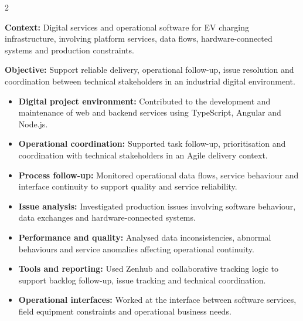 \documentclass[8pt,a4paper,ragged2e,withhyper]{altacv}
\begin{document}



\makecvheader
\vspace{-0.3cm}


\begin{paracol}{2}



\textbf{Context:} Digital services and operational software for EV charging infrastructure, involving platform services, data flows, hardware-connected systems and production constraints.

\textbf{Objective:} Support reliable delivery, operational follow-up, issue resolution and coordination between technical stakeholders in an industrial digital environment.

\begin{itemize}
  \item \textbf{Digital project environment:} Contributed to the development and maintenance of web and backend services using TypeScript, Angular and Node.js.
  \item \textbf{Operational coordination:} Supported task follow-up, prioritisation and coordination with technical stakeholders in an Agile delivery context.
  \item \textbf{Process follow-up:} Monitored operational data flows, service behaviour and interface continuity to support quality and service reliability.
  \item \textbf{Issue analysis:} Investigated production issues involving software behaviour, data exchanges and hardware-connected systems.
  \item \textbf{Performance and quality:} Analysed data inconsistencies, abnormal behaviours and service anomalies affecting operational continuity.
  \item \textbf{Tools and reporting:} Used Zenhub and collaborative tracking logic to support backlog follow-up, issue tracking and technical coordination.
  \item \textbf{Operational interfaces:} Worked at the interface between software services, field equipment constraints and operational business needs.
\end{itemize}


\end{paracol}
\end{document}
